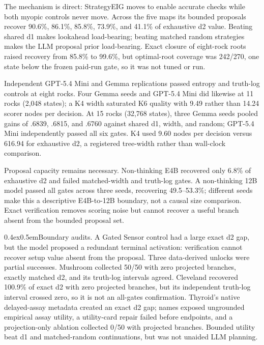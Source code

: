 \documentclass[10pt]{article}
\makeatletter
\renewcommand\paragraph{\@startsection{paragraph}{4}{0pt}%
  {0.4ex}{0.5em}{\normalfont\normalsize\bfseries}}
\makeatother
\begin{document}
The mechanism is direct: StrategyEIG moves to enable accurate checks while both
myopic controls never move. Across the five maps its bounded proposals recover
90.6\%, 86.1\%, 85.8\%, 73.9\%, and 41.1\% of exhaustive d2 value. Beating
shared d1 makes lookahead load-bearing; beating matched random strategies makes
the LLM proposal prior load-bearing. Exact closure of eight-rock roots raised
recovery from 85.8\% to 99.6\%, but optimal-root coverage was 242/270, one state
below the frozen paid-run gate, so it was not tuned or run.

Independent GPT-5.4 Mini and Gemma replications passed entropy and truth-log
controls at eight rocks. Four Gemma seeds and GPT-5.4 Mini did likewise at
11 rocks (2,048 states); a K4 width saturated K6 quality with 9.49 rather than
14.24 scorer nodes per decision. At 15 rocks (32,768 states), three Gemma seeds
pooled gains of .6839, .6815, and .6760 against shared d1, width, and random;
GPT-5.4 Mini independently passed all six gates. K4 used 9.60 nodes per decision
versus 616.94 for exhaustive d2, a registered tree-width rather than wall-clock
comparison.

Proposal capacity remains necessary. Non-thinking E4B recovered only 6.8\% of
exhaustive d2 and failed matched-width and truth-log gates. A non-thinking 12B
model passed all gates across three seeds, recovering 49.5--53.3\%; different
seeds make this a descriptive E4B-to-12B boundary, not a causal size comparison.
Exact verification removes scoring noise but cannot recover a useful branch
absent from the bounded proposal set.

\paragraph{Boundary audits.}
A Gated Sensor control had a large exact d2 gap, but the model proposed a
redundant terminal activation: verification cannot recover setup value absent
from the proposal. Three data-derived unlocks were partial successes. Mushroom
collected 50/50 with zero projected branches, exactly matched d2, and its
truth-log intervals agreed. Cleveland recovered 100.9\% of exact d2 with zero
projected branches, but its independent truth-log interval crossed zero, so it
is not an all-gates confirmation. Thyroid's native delayed-assay metadata
created an exact d2 gap; names exposed ungrounded empirical assay utility, a
utility-card repair failed before endpoints, and a projection-only ablation
collected 0/50 with projected branches. Bounded utility beat d1 and
matched-random continuations, but was not unaided LLM planning.
\end{document}

